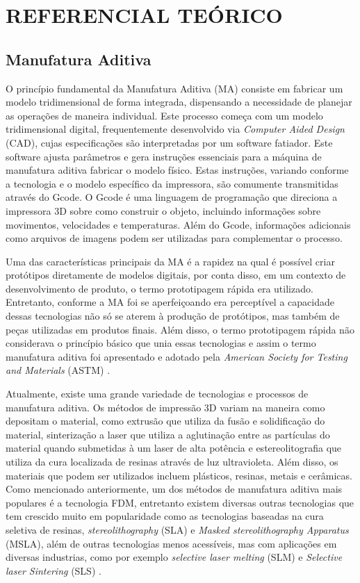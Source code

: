 \chapter{REFERENCIAL TEÓRICO}

\section{Manufatura Aditiva}
O princípio fundamental da Manufatura Aditiva (MA) consiste em fabricar um modelo tridimensional de forma integrada, dispensando a necessidade de planejar as operações de maneira individual. Este processo começa com um modelo tridimensional digital, frequentemente desenvolvido via \textit{Computer Aided Design} (CAD), cujas especificações são interpretadas por um software fatiador. Este software ajusta parâmetros e gera instruções essenciais para a máquina de manufatura aditiva fabricar o modelo físico. Estas instruções, variando conforme a tecnologia e o modelo específico da impressora, são comumente transmitidas através do Gcode. O Gcode é uma linguagem de programação que direciona a impressora 3D sobre como construir o objeto, incluindo informações sobre movimentos, velocidades e temperaturas. Além do Gcode, informações adicionais como arquivos de imagens podem ser utilizadas para complementar o processo.

Uma das características principais da MA é a rapidez na qual é possível criar protótipos diretamente de modelos digitais, por conta disso, em um contexto de desenvolvimento de produto, o termo prototipagem rápida era utilizado. Entretanto, conforme a MA foi se aperfeiçoando era perceptível a capacidade dessas tecnologias não só se aterem à produção de protótipos, mas também de peças utilizadas em produtos finais. Além disso, o termo prototipagem rápida não considerava o princípio básico que unia essas tecnologias e assim o termo manufatura aditiva foi apresentado e adotado pela \textit{American Society for Testing and Materials} (ASTM) \cite{gibson15}.

Atualmente, existe uma grande variedade de tecnologias e processos de manufatura aditiva. Os métodos de impressão 3D variam na maneira como depositam o material, como extrusão que utiliza da fusão e solidificação do material, sinterização a  laser que utiliza a aglutinação entre as partículas do material quando submetidas à um laser de alta potência e estereolitografia que utiliza da cura localizada de resinas através de luz ultravioleta. Além disso, os materiais que podem ser utilizados incluem plásticos, resinas, metais e cerâmicas. Como mencionado anteriormente, um dos métodos de manufatura aditiva mais populares é a tecnologia FDM, entretanto existem diversas outras tecnologias que tem crescido muito em popularidade como as tecnologias baseadas na cura seletiva de resinas, \textit{stereolithography} (SLA) e \textit{Masked stereolithography Apparatus} (MSLA), além de outras tecnologias menos acessíveis, mas com aplicações em diversas industrias, como por exemplo \textit{selective laser melting} (SLM) e \textit{Selective laser Sintering} (SLS) \cite{bikas16}.

